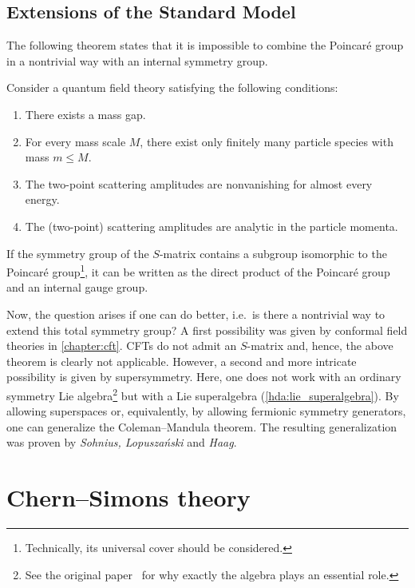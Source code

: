 \subsection{Extensions of the Standard Model}

    The following theorem states that it is impossible to combine the Poincar\'e group in a nontrivial way with an internal symmetry group.
    \begin{theorem}
        Consider a quantum field theory satisfying the following conditions:
        \begin{enumerate}
            \item There exists a mass gap.
            \item For every mass scale $M$, there exist only finitely many particle species with mass $m\leq M$.
            \item The two-point scattering amplitudes are nonvanishing for almost every energy.
            \item The (two-point) scattering amplitudes are analytic in the particle momenta.
        \end{enumerate}
        If the symmetry group of the $S$-matrix contains a subgroup isomorphic to the Poincar\'e group\footnote{Technically, its universal cover should be considered.}, it can be written as the direct product of the Poincar\'e group and an internal gauge group.
    \end{theorem}

    Now, the question arises if one can do better, i.e.~is there a nontrivial way to extend this total symmetry group? A first possibility was given by conformal field theories in \cref{chapter:cft}. CFTs do not admit an $S$-matrix and, hence, the above theorem is clearly not applicable. However, a second and more intricate possibility is given by supersymmetry. Here, one does not work with an ordinary symmetry Lie algebra\footnote{See the original paper~\citet{coleman_all_1967} for why exactly the algebra plays an essential role.} but with a Lie superalgebra (\cref{hda:lie_superalgebra}). By allowing superspaces or, equivalently, by allowing fermionic symmetry generators, one can generalize the Coleman--Mandula theorem. The resulting generalization was proven by \textit{Sohnius, Lopusza\'nski} and \textit{Haag}.

\section{Chern--Simons theory}

